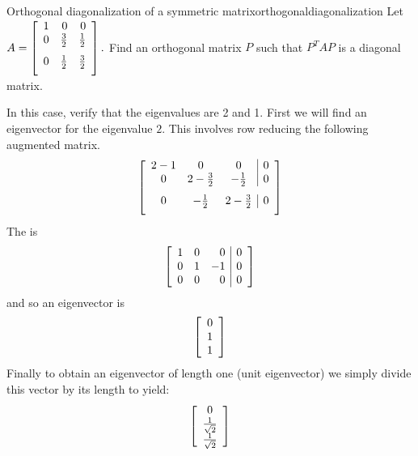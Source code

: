 \begin{example}{Orthogonal diagonalization of a symmetric matrix}{orthogonaldiagonalization}
Let $A=\leftB
\begin{array}{rrr}
1 & 0 & 0 \\
0 & \vspace{0.05in}\frac{3}{2} & \vspace{0.05in}\frac{1}{2} \\
0 & \vspace{0.05in}\frac{1}{2} & \vspace{0.05in}\frac{3}{2}
\end{array}
\rightB .$ 
Find an orthogonal matrix $P$ such that $P^{T}AP$ is a diagonal
matrix.
\end{example}

\begin{solution}
In this case, verify that the eigenvalues are 2 and 1. First
we will find an eigenvector for the eigenvalue $2$. This involves row
reducing the following augmented matrix. 
\begin{equation*}
\leftB 
\begin{array}{ccc|c}
2 - 1 & 0 & 0 & 0 \\ 
0 & 2-\vspace{0.05in}\frac{3}{2} & -\vspace{0.05in}\frac{1}{2} & 0 \\ 
0 & -\vspace{0.05in}\frac{1}{2} & 2-\vspace{0.05in}\frac{3}{2} & 0
\end{array}
\rightB
\end{equation*}
The {\rref} is 
\begin{equation*}
\left[ 
\begin{array}{rrr|r}
1 & 0 & 0 & 0 \\ 
0 & 1 & -1 & 0 \\ 
0 & 0 & 0 & 0
\end{array}
\right]
\end{equation*}
and so an eigenvector is 
\begin{equation*}
\left[ 
\begin{array}{c}
0 \\ 
1 \\ 
1
\end{array}
\right] 
\end{equation*}
Finally to obtain an eigenvector of length one (unit eigenvector) we simply  divide this vector by its length to yield:
\begin{equation*}
\left[ 
\begin{array}{c}
0 \\ 
\frac{1}{\sqrt{2}} \\ 
\frac{1}{\sqrt{2}}
\end{array}
\right] 
\end{equation*}


\end{solution}
